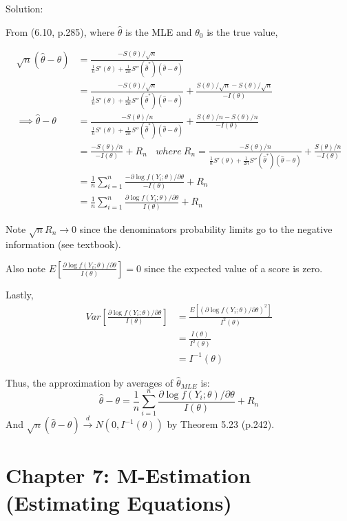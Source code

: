 \documentclass[
  letterpaper,
  DIV=11,
  numbers=noendperiod]{scrreprt}
\begin{document}
Solution:

From (6.10, p.285), where \(\hat \theta\) is the MLE and \(\theta_0\) is
the true value,

\[\begin{aligned}
\sqrt n (\hat \theta -\theta) &= \frac{-S(\theta)/\sqrt n}{\frac 1 n S'(\theta) + \frac 1 {2n} S''(\hat \theta^*)( \hat \theta - \theta)} \\
&= \frac{-S(\theta)/\sqrt n}{\frac 1 n S'(\theta) + \frac 1 {2n} S''(\hat \theta^*)( \hat \theta - \theta)} +\frac{S(\theta)/\sqrt n-S(\theta)/\sqrt n}{-I(\theta)} \\
\implies \hat \theta - \theta&= \frac{-S(\theta)/ n}{\frac 1 n S'(\theta) + \frac 1 {2n} S''(\hat \theta^*)( \hat \theta - \theta)} +\frac{S(\theta)/n-S(\theta)/ n}{-I(\theta)} \\
&= \frac{-S(\theta)/ n}{-I(\theta)} + R_n ~~~~ where~ R_n =\frac{-S(\theta)/ n}{\frac 1 n S'(\theta) + \frac 1 {2n} S''(\hat \theta^*)( \hat \theta - \theta)}+\frac{S(\theta)/n}{-I(\theta)}\\
&= \frac 1 n \sum_{i=1}^n \frac{-\partial \log f(Y_i; \theta)/\partial \theta}{-I(\theta)} + R_n \\
&= \frac 1 n \sum_{i=1}^n \frac{\partial \log f(Y_i; \theta)/\partial \theta}{I(\theta)} + R_n
\end{aligned}\]

Note \(\sqrt n R_n \to 0\) since the denominators probability limits go
to the negative information (see textbook).

Also note
\(E\left[\frac{\partial \log f(Y_i; \theta)/\partial \theta}{I(\theta)}\right] = 0\)
since the expected value of a score is zero.

Lastly, \[\begin{aligned}
Var\left[\frac{\partial \log f(Y_i; \theta)/\partial \theta}{I(\theta)}\right]
&=\frac{E[(\partial \log f(Y_i; \theta)/\partial \theta)^2]}{I^2(\theta)}\\
&= \frac{I(\theta)}{I^2(\theta)} \\
&= I^{-1}(\theta)
\end{aligned}
\]

Thus, the approximation by averages of \(\hat \theta_{MLE}\) is:
\[\hat \theta -\theta =\frac 1 n \sum_{i=1}^n \frac{\partial \log f(Y_i; \theta)/\partial \theta}{I(\theta)} + R_n\]
And
\(\sqrt n (\hat \theta -\theta) \overset d \to N(0, I^{-1}(\theta))\) by
Theorem 5.23 (p.242).


\hypertarget{chapter-7-m-estimation-estimating-equations}{%
\chapter{Chapter 7: M-Estimation (Estimating
Equations)}\label{chapter-7-m-estimation-estimating-equations}}
\end{document}
